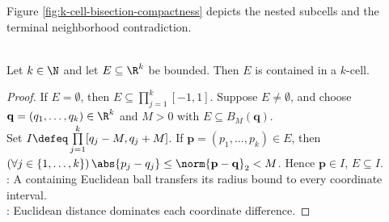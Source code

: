Figure \ref{fig:k-cell-bisection-compactness} depicts the nested subcells and the terminal neighborhood contradiction.
\begin{illustrationfigure}[H]
  \centering
  
  \caption{Successive outlined subcells form a nested chain; the dashed ball about $\mathbf{x}^*$ eventually contains a selected subcell.}
  \label{fig:k-cell-bisection-compactness}
\end{illustrationfigure}

\begin{lemma} \label{lem:bounded-rk-set-contained-in-k-cell} \\
Let $k\in\N$ and let $E\subseteq\R^k$ be bounded. Then $E$ is contained in a $k$-cell.
\begin{proof}
If $E=\emptyset$, then $E\subseteq\prod\limits_{j=1}^{k}[-1,1]$. Suppose $E\ne\emptyset$, and choose $\mathbf{q}=(q_1,\ldots,q_k)\in\R^k$ and $M>0$ with $E\subseteq B_M(\mathbf{q})$.\\
Set $I\defeq\prod\limits_{j=1}^{k}[q_j-M,q_j+M]$. If $\mathbf{p}=(p_1,\ldots,p_k)\in E$, then $(\forall j\in\{1,\ldots,k\})\,\abs{p_j-q_j}\leq\norm{\mathbf{p}-\mathbf{q}}_2<M$. Hence $\mathbf{p}\in I$, $E\subseteq I$.\\
: A containing Euclidean ball transfers its radius bound to every coordinate interval.\\
: Euclidean distance dominates each coordinate difference.
\end{proof}
\end{lemma}

